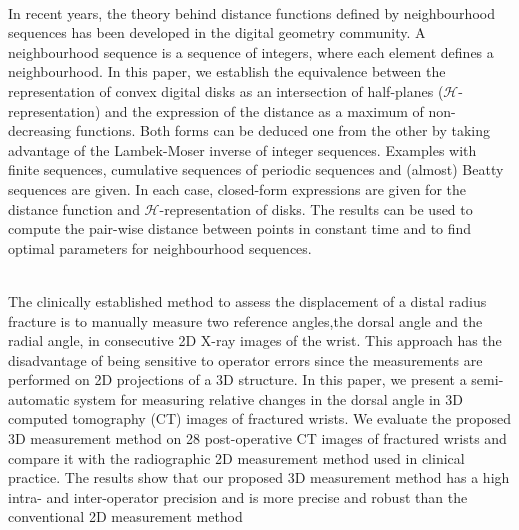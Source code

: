 {{{\begin{enumerate}
 
\\ \aabstract
In recent years, the theory behind distance functions defined by neighbourhood sequences has been developed in the digital geometry community. A neighbourhood sequence is a sequence of integers, where each element defines a neighbourhood. In this paper, we establish the equivalence between the representation of convex digital disks as an intersection of half-planes ($\mathcal{H}$-representation) and the expression of the distance as a maximum of non-decreasing functions. Both forms can be deduced one from the other by taking advantage of the Lambek-Moser inverse of integer sequences. Examples with finite sequences, cumulative sequences of periodic sequences and (almost) Beatty sequences are given. In each case, closed-form expressions are given for the distance function and $\mathcal{H}$-representation of disks. The results can be used to compute the pair-wise distance between points in constant time and to find optimal parameters for neighbourhood sequences.

\\ \aabstract
 The clinically established method to assess the displacement of a distal radius fracture is to manually measure two reference angles,the dorsal angle and the radial angle, in consecutive 2D X-ray images of the wrist. This approach has the disadvantage of being sensitive to operator errors since the measurements are performed on 2D projections of a 3D structure. In this paper, we present a semi-automatic system for measuring relative changes in the dorsal angle in 3D computed tomography (CT) images of fractured wrists. We evaluate the proposed 3D measurement method on 28 post-operative CT images of fractured wrists and compare it with the radiographic 2D measurement method used in clinical practice. The results show that our proposed 3D measurement method has a high intra- and inter-operator precision and is more precise and robust than the conventional 2D measurement method


\end{enumerate}}}}
